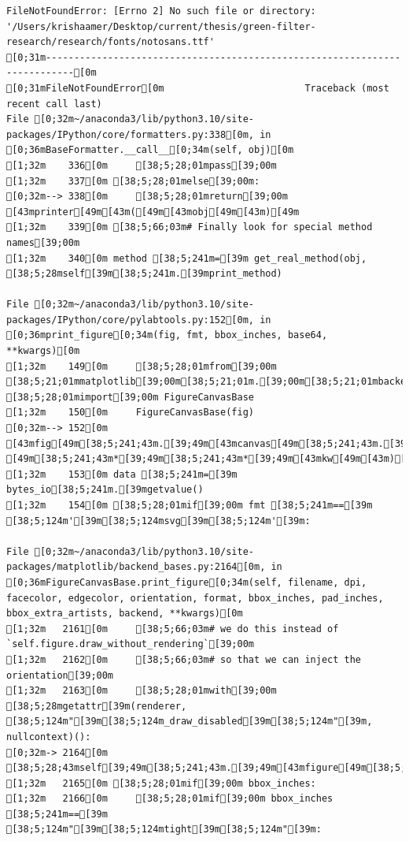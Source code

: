 \documentclass[
  letterpaper,
  DIV=11,
  numbers=noendperiod]{scrartcl}
\begin{document}
\begin{verbatim}
FileNotFoundError: [Errno 2] No such file or directory: '/Users/krishaamer/Desktop/current/thesis/green-filter-research/research/fonts/notosans.ttf'
[0;31m---------------------------------------------------------------------------[0m
[0;31mFileNotFoundError[0m                         Traceback (most recent call last)
File [0;32m~/anaconda3/lib/python3.10/site-packages/IPython/core/formatters.py:338[0m, in [0;36mBaseFormatter.__call__[0;34m(self, obj)[0m
[1;32m    336[0m     [38;5;28;01mpass[39;00m
[1;32m    337[0m [38;5;28;01melse[39;00m:
[0;32m--> 338[0m     [38;5;28;01mreturn[39;00m [43mprinter[49m[43m([49m[43mobj[49m[43m)[49m
[1;32m    339[0m [38;5;66;03m# Finally look for special method names[39;00m
[1;32m    340[0m method [38;5;241m=[39m get_real_method(obj, [38;5;28mself[39m[38;5;241m.[39mprint_method)

File [0;32m~/anaconda3/lib/python3.10/site-packages/IPython/core/pylabtools.py:152[0m, in [0;36mprint_figure[0;34m(fig, fmt, bbox_inches, base64, **kwargs)[0m
[1;32m    149[0m     [38;5;28;01mfrom[39;00m [38;5;21;01mmatplotlib[39;00m[38;5;21;01m.[39;00m[38;5;21;01mbackend_bases[39;00m [38;5;28;01mimport[39;00m FigureCanvasBase
[1;32m    150[0m     FigureCanvasBase(fig)
[0;32m--> 152[0m [43mfig[49m[38;5;241;43m.[39;49m[43mcanvas[49m[38;5;241;43m.[39;49m[43mprint_figure[49m[43m([49m[43mbytes_io[49m[43m,[49m[43m [49m[38;5;241;43m*[39;49m[38;5;241;43m*[39;49m[43mkw[49m[43m)[49m
[1;32m    153[0m data [38;5;241m=[39m bytes_io[38;5;241m.[39mgetvalue()
[1;32m    154[0m [38;5;28;01mif[39;00m fmt [38;5;241m==[39m [38;5;124m'[39m[38;5;124msvg[39m[38;5;124m'[39m:

File [0;32m~/anaconda3/lib/python3.10/site-packages/matplotlib/backend_bases.py:2164[0m, in [0;36mFigureCanvasBase.print_figure[0;34m(self, filename, dpi, facecolor, edgecolor, orientation, format, bbox_inches, pad_inches, bbox_extra_artists, backend, **kwargs)[0m
[1;32m   2161[0m     [38;5;66;03m# we do this instead of `self.figure.draw_without_rendering`[39;00m
[1;32m   2162[0m     [38;5;66;03m# so that we can inject the orientation[39;00m
[1;32m   2163[0m     [38;5;28;01mwith[39;00m [38;5;28mgetattr[39m(renderer, [38;5;124m"[39m[38;5;124m_draw_disabled[39m[38;5;124m"[39m, nullcontext)():
[0;32m-> 2164[0m         [38;5;28;43mself[39;49m[38;5;241;43m.[39;49m[43mfigure[49m[38;5;241;43m.[39;49m[43mdraw[49m[43m([49m[43mrenderer[49m[43m)[49m
[1;32m   2165[0m [38;5;28;01mif[39;00m bbox_inches:
[1;32m   2166[0m     [38;5;28;01mif[39;00m bbox_inches [38;5;241m==[39m [38;5;124m"[39m[38;5;124mtight[39m[38;5;124m"[39m:


\end{verbatim}
\end{document}
